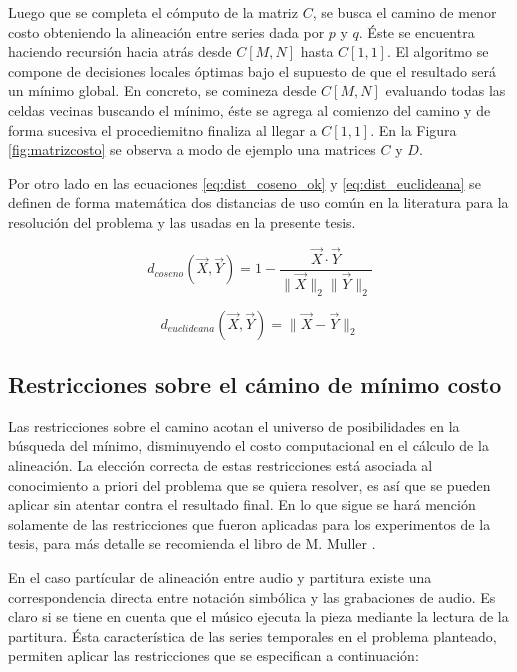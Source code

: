 \documentclass
  [ams,pdfout]%
	{aeslac}
\begin{document}
Luego que se completa el cómputo de la matriz $C$, se busca el camino de menor costo obteniendo la alineación entre series dada por $p$ y $q$. Éste se encuentra haciendo recursión hacia atrás desde $C[M,N]$ hasta $C[1,1]$. El algoritmo se compone de decisiones locales óptimas bajo el supuesto de que el resultado será un mínimo global. En concreto, se comineza desde $C[M,N]$ evaluando todas las celdas vecinas buscando el mínimo, éste se agrega al comienzo del camino y de forma sucesiva el procediemitno finaliza al llegar a $C[1,1]$. En la Figura \ref{fig:matrizcosto} se observa a modo de ejemplo una matrices $C$ y $D$. 


Por otro lado en las ecuaciones \ref{eq:dist_coseno_ok} y \ref{eq:dist_euclideana} se definen de forma matemática dos distancias de uso común en la literatura para la resolución del problema y las usadas en la presente tesis.


\begin{equation}
\label{eq:dist_coseno_ok}
d_{coseno}(\vec{X},\vec{Y}) = 1 - \frac{\vec{X}\cdot\vec{Y}}{\lVert\vec{X}\rVert_{2}\lVert\vec{Y}\rVert_{2}}
\end{equation}

\begin{equation}
\label{eq:dist_euclideana}
d_{euclideana}(\vec{X},\vec{Y}) = \lVert \vec{X} - \vec{Y} \rVert_{2}
\end{equation}


\subsection{Restricciones sobre el cámino de mínimo costo}
\label{sec:restricciones}

Las restricciones sobre el camino acotan el universo de posibilidades en la búsqueda del mínimo, disminuyendo el costo computacional en el cálculo de la alineación. La elección correcta de estas restricciones está asociada al conocimiento a priori del problema que se quiera resolver, es así que se pueden aplicar sin atentar contra el resultado final. En lo que sigue se hará mención solamente de las restricciones que fueron aplicadas para los experimentos de la tesis, para más detalle se recomienda el libro de M. Muller \cite{muller2007information}.
  
En el caso partícular de alineación entre audio y partitura existe una correspondencia directa entre notación simbólica y las grabaciones de audio. Es claro si se tiene en cuenta que el músico ejecuta la pieza mediante la lectura de la partitura. Ésta característica de las series temporales en el problema planteado, permiten aplicar las restricciones que se especifican a continuación:
\end{document}
